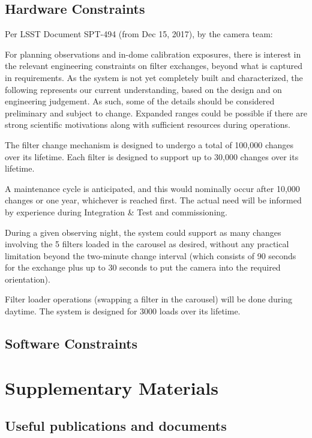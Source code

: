 \documentclass[DM,lsstdraft,toc,usenatbib]{lsstdoc}
\begin{document}
\subsection{Hardware Constraints}

Per LSST Document SPT-494 (from Dec 15, 2017), by the camera team:

For planning observations and in-dome calibration exposures, there is interest in the relevant engineering constraints on filter exchanges, beyond what is captured in requirements. As the system is not yet completely built and characterized, the following represents our current understanding, based on the design and on engineering judgement. As such, some of the details should be considered preliminary and subject to change. Expanded ranges could be possible if there are strong scientific motivations along with sufficient resources during operations.

The filter change mechanism is designed to undergo a total of 100,000 changes over its lifetime. Each filter is designed to support up to 30,000 changes over its lifetime.

A maintenance cycle is anticipated, and this would nominally occur after 10,000 changes or one year, whichever is reached first. The actual need will be informed by experience during Integration \& Test and commissioning.

During a given observing night, the system could support as many changes involving the 5 filters loaded in the carousel as desired, without any practical limitation beyond the two-minute change interval (which consists of 90 seconds for the exchange plus up to 30 seconds to put the camera into the required orientation). 

Filter loader operations (swapping a filter in the carousel) will be done during daytime. The system is designed for 3000 loads over its lifetime. 


\subsection{Software Constraints} 


\section{Supplementary Materials} 

\subsection{Useful publications and documents}
\end{document}
